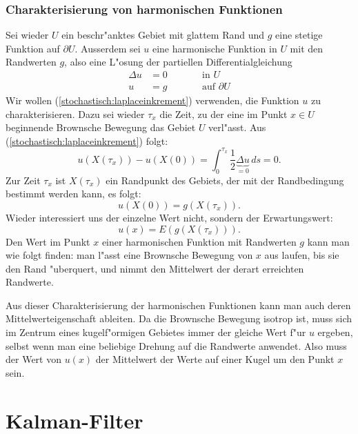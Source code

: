 \subsubsection{Charakterisierung von harmonischen Funktionen}
Sei wieder $U$ ein beschr"anktes Gebiet mit glattem Rand und
$g$ eine stetige Funktion auf $\partial U$.
Ausserdem sei $u$ eine harmonische Funktion in $U$ mit den Randwerten $g$, 
also eine L"osung der partiellen Differentialgleichung
\begin{equation}
\begin{aligned}
\Delta u&=0&\qquad&\text{in $U$}\\
       u&=g&      &\text{auf $\partial U$}
\end{aligned}
\label{stochastisch:harmonisch}
\end{equation}
Wir wollen (\ref{stochastisch:laplaceinkrement}) verwenden, die Funktion
$u$ zu charakterisieren.
Dazu sei wieder $\tau_x$ die Zeit, zu der eine im Punkt $x\in U$ beginnende
Brownsche Bewegung das Gebiet $U$ verl"asst.
Aus (\ref{stochastisch:laplaceinkrement}) folgt:
\[
u(X(\tau_x))-u(X(0))
=
\int_0^{\tau_x} \frac12\underbrace{\Delta u}_{\textstyle=0}\,ds=0.
\]
Zur Zeit $\tau_x$ ist $X(\tau_x)$ ein Randpunkt des Gebiets, der mit
der Randbedingung bestimmt werden kann, es folgt:
\[
u(X(0)) = g(X(\tau_x)).
\]
Wieder interessiert uns der einzelne Wert nicht, sondern der Erwartungswert:
\[
u(x)=E(g(X(\tau_x))).
\]
Den Wert im Punkt $x$ einer harmonischen Funktion mit Randwerten $g$
kann man wie folgt finden: man l"asst eine Brownsche Bewegung von $x$ 
aus laufen, bis sie den Rand "uberquert, und nimmt den Mittelwert
der derart erreichten Randwerte.

Aus dieser Charakterisierung der harmonischen Funktionen kann man
auch deren Mittelwerteigenschaft ableiten. 
Da die Brownsche Bewegung isotrop ist, muss sich im Zentrum
eines kugelf"ormigen Gebietes immer der gleiche Wert f"ur $u$
ergeben, selbst wenn man eine beliebige Drehung auf die Randwerte 
anwendet.
Also muss der Wert von $u(x)$ der Mittelwert der Werte
auf einer Kugel um den Punkt $x$ sein.

%
%
%
\section{Kalman-Filter\label{section:kalman}}





